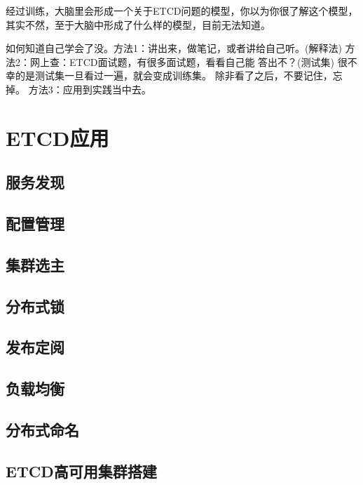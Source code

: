 经过训练，大脑里会形成一个关于ETCD问题的模型，你以为你很了解这个模型，其实不然，至于大脑中形成了什么样的模型，目前无法知道。


如何知道自己学会了没。方法1：讲出来，做笔记，或者讲给自己听。(解释法) 方法2：网上查：ETCD面试题，有很多面试题，看看自己能
答出不？(测试集) 很不幸的是测试集一旦看过一遍，就会变成训练集。 除非看了之后，不要记住，忘掉。 方法3：应用到实践当中去。

\section{ETCD应用}
\subsection{服务发现}
\subsection{配置管理}
\subsection{集群选主}
\subsection{分布式锁}
\subsection{发布定阅}
\subsection{负载均衡}
\subsection{分布式命名}
\subsection{ETCD高可用集群搭建}

